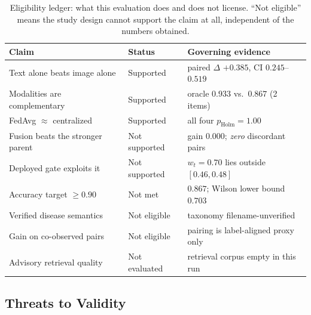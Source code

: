 \documentclass[conference]{IEEEtran}
\begin{document}
\begin{table}[!t]
\caption{Eligibility ledger: what this evaluation does and does not license. ``Not eligible'' means the study design cannot support the claim at all, independent of the numbers obtained.}
\label{tab:ledger}
\centering\scriptsize
\setlength\tabcolsep{2.2pt}
\renewcommand{\arraystretch}{1.05}
\begin{tabular}{@{}p{}p{}p{}@{}}
\toprule
\textbf{Claim} & \textbf{Status} & \textbf{Governing evidence}\\
\midrule
\rowcolor{vitgreen!28}
Text alone beats image alone & Supported & paired $\Delta$ $+0.385$, CI $0.245$--$0.519$\\
\rowcolor{vitgreen!28}
Modalities are complementary & Supported & oracle $0.933$ vs.\ $0.867$ (2 items)\\
\rowcolor{vitgreen!28}
FedAvg $\approx$ centralized & Supported & all four $p_{\text{Holm}}{=}1.00$\\
\midrule
\rowcolor{vlmred!28}
Fusion beats the stronger parent & Not supported & gain $0.000$; \emph{zero} discordant pairs\\
\rowcolor{vlmred!28}
Deployed gate exploits it & Not supported & $w_t{=}0.70$ lies outside $[0.46,0.48]$\\
\rowcolor{vlmred!28}
Accuracy target $\geq 0.90$ & Not met & $0.867$; Wilson lower bound $0.703$\\
\midrule
\rowcolor{smallgray!45}
Verified disease semantics & Not eligible & taxonomy filename-unverified\\
\rowcolor{smallgray!45}
Gain on co-observed pairs & Not eligible & pairing is label-aligned proxy only\\
\rowcolor{smallgray!45}
Advisory retrieval quality & Not evaluated & retrieval corpus empty in this run\\
\bottomrule
\end{tabular}
\end{table}

\subsection{Threats to Validity}
\label{sec:limits}
\end{document}
